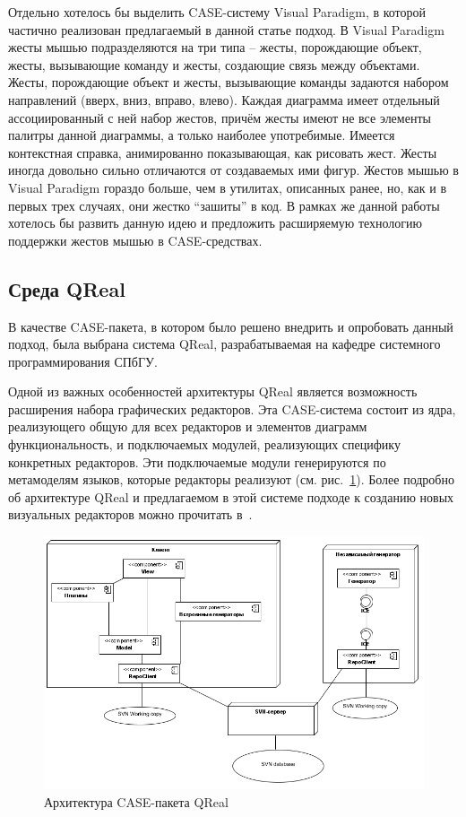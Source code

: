 \documentclass[a5paper]{article}
\begin{document}
Отдельно хотелось бы выделить CASE-систему Visual Paradigm, в которой частично реализован предлагаемый в данной статье подход. В Visual Paradigm жесты мышью подразделяются на три типа – жесты, порождающие объект, жесты, вызывающие команду и жесты, создающие связь между объектами. Жесты, порождающие объект и жесты, вызывающие команды задаются набором направлений (вверх, вниз, вправо, влево). Каждая диаграмма имеет отдельный ассоциированный с ней набор жестов, причём жесты имеют не все элементы палитры данной диаграммы, а только наиболее употребимые. Имеется контекстная справка, анимированно показывающая, как рисовать жест. Жесты иногда довольно сильно отличаются от создаваемых ими фигур. Жестов мышью в Visual Paradigm гораздо больше, чем в  утилитах, описанных ранее, но, как и в первых трех случаях, они жестко ``зашиты'' в код. В рамках же данной работы хотелось бы развить данную идею и предложить расширяемую технологию поддержки жестов мышью в CASE-средствах.

\subsection{Среда QReal}
В качестве CASE-пакета, в котором было решено внедрить и опробовать данный подход, была выбрана система QReal, разрабатываемая на кафедре системного программирования СПбГУ. 

Одной из важных особенностей архитектуры QReal является возможность расширения набора графических редакторов. Эта CASE-система состоит из ядра, реализующего общую для всех редакторов и элементов диаграмм функциональность, и подключаемых модулей, реализующих специфику конкретных редакторов. Эти подключаемые модули генерируются по метамоделям языков, которые редакторы реализуют (см. рис.~\ref{architecture}). Более подробно об архитектуре QReal и предлагаемом в этой системе подходе к  созданию новых визуальных редакторов можно прочитать в~\cite{qreal}. 

\begin{figure} [ht]
  \begin{center}
    \includegraphics[width=1\textwidth, bb=0 0 798 531]{01-architecture.png}
    \caption{Архитектура CASE-пакета QReal}
    \label{architecture}
  \end{center}
\end{figure}
\end{document}

